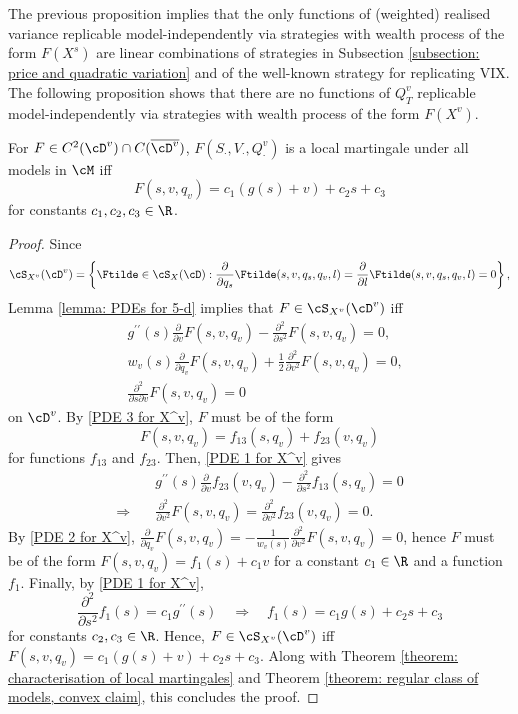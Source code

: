 \documentclass[11pt]{article}
\begin{document}
The previous proposition implies that the only functions of (weighted) realised variance replicable model-independently via strategies with wealth process of the form $F(X^s)$ are linear combinations of strategies in Subsection \ref{subsection: price and quadratic variation} and of the well-known strategy for replicating VIX. The following proposition shows that there are no functions of $Q^v_T$ replicable model-independently via strategies with wealth process of the form $F(X^v)$.
\begin{proposition}
\label{proposition: MFVV}
For $F \in C^2(\cD^v) \cap C(\overline{\cD^v})$, $F(S_\cdot, V_\cdot, Q^v_\cdot)$ is a local martingale under all models in $\cM$ iff
\begin{equation}
\label{MFVV}
F(s, v, q_v) = c_1 (g(s) + v) + c_2 s + c_3
\end{equation}
for constants $c_1, c_2, c_3 \in \R$.
\end{proposition}

\begin{proof}

Since 
$$
\cS_{X^v}(\cD^v) = \left\{ \Ftilde \in \cS_X(\cD) : \frac{\partial}{\partial q_s} \Ftilde(s, v, q_s, q_v, l) = \frac{\partial}{\partial l} \Ftilde(s, v, q_s, q_v, l) = 0 \right\},
$$
Lemma \ref{lemma: PDEs for 5-d} implies that $F \in \cS_{X^v}(\cD^v)$ iff
\begin{align} 
&g^{\prime\prime}(s) \frac{\partial}{\partial v} F(s, v, q_v) - \frac{\partial^2}{\partial s^2} F(s, v, q_v) = 0, \label{PDE 1 for X^v} \\
%
%
%
&w_v(s) \frac{\partial}{\partial q_v} F(s, v, q_v) + \frac{1}{2} \frac{\partial^2}{\partial v^2} F(s, v, q_v) = 0, \label{PDE 2 for X^v} \\
%
%
%
&\frac{\partial^2}{\partial s \partial v} F(s, v, q_v) = 0 \label{PDE 3 for X^v}
\end{align}
on $\cD^v$. By \eqref{PDE 3 for X^v}, $F$ must be of the form
$$
F(s, v, q_v) = f_{13}(s, q_v) + f_{23}(v, q_v)
$$
for functions $f_{13}$ and $f_{23}$. Then, \eqref{PDE 1 for X^v} gives
\begin{align*}
&g^{\prime\prime}(s) \frac{\partial}{\partial v} f_{23}(v, q_v) - \frac{\partial^2}{\partial s^2} f_{13}(s, q_v) = 0\\
%
%
%
\Rightarrow \quad &\frac{\partial^2}{\partial v^2} F(s, v, q_v) = \frac{\partial^2}{\partial v^2} f_{23}(v, q_v) = 0.
\end{align*}
By \eqref{PDE 2 for X^v}, $\frac{\partial}{\partial q_v} F(s, v, q_v) = -\frac{1}{w_v(s)} \frac{\partial^2}{\partial v^2} F(s, v, q_v) = 0$, hence $F$ must be of the form $F(s, v, q_v) = f_1(s) + c_1 v$
for a constant $c_1 \in \R$ and a function $f_1$. Finally, by \eqref{PDE 1 for X^v},
$$
\frac{\partial^2}{\partial s^2} f_1(s) = c_1 g^{\prime\prime}(s) \quad \Rightarrow \quad f_1(s) = c_1 g(s) + c_2 s + c_3
$$
for constants $c_2, c_3 \in \R$. Hence, $F \in \cS_{X^v}(\cD^v)$ iff $F(s, v, q_v) = c_1 (g(s) + v) + c_2 s + c_3$. Along with Theorem \ref{theorem: characterisation of local martingales} and Theorem \ref{theorem: regular class of models, convex claim}, this concludes the proof.

\end{proof}
\end{document}
